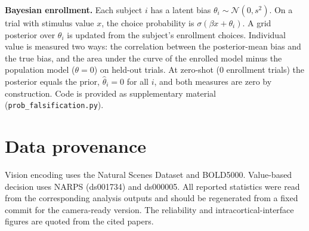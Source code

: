 \documentclass{article}
\begin{document}
\textbf{Bayesian enrollment.} Each subject $i$ has a latent bias $\theta_i\sim\mathcal{N}(0,s^2)$. On a trial
with stimulus value $x$, the choice probability is $\sigma(\beta x+\theta_i)$. A grid posterior over
$\theta_i$ is updated from the subject's enrollment choices. Individual value is measured two ways: the
correlation between the posterior-mean bias and the true bias, and the area under the curve of the enrolled
model minus the population model ($\theta=0$) on held-out trials. At zero-shot ($0$ enrollment trials) the
posterior equals the prior, $\hat\theta_i=0$ for all $i$, and both measures are zero by construction. Code
is provided as supplementary material (\texttt{prob\_falsification.py}).

\section{Data provenance}
\label{app:data}
Vision encoding uses the Natural Scenes Dataset and BOLD5000. Value-based decision uses NARPS (ds001734) and
ds000005. All reported statistics were read from the corresponding analysis outputs and should be
regenerated from a fixed commit for the camera-ready version. The reliability and intracortical-interface
figures are quoted from the cited papers.
\end{document}
